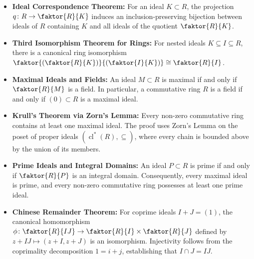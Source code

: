 \begin{overview}
\begin{itemize}
    \item \textbf{Ideal Correspondence Theorem:} For an ideal $K \subset R$, the projection $q \colon R \to \faktor{R}{K}$ induces an inclusion-preserving bijection between ideals of $R$ containing $K$ and all ideals of the quotient $\faktor{R}{K}$.
    \item \textbf{Third Isomorphism Theorem for Rings:} For nested ideals $K \subseteq I \subseteq R$, there is a canonical ring isomorphism $\faktor{\left(\faktor{R}{K}\right)}{\left(\faktor{I}{K}\right)} \cong \faktor{R}{I}$.
    \item \textbf{Maximal Ideals and Fields:} An ideal $M \subset R$ is maximal if and only if $\faktor{R}{M}$ is a field. In particular, a commutative ring $R$ is a field if and only if $(0) \subset R$ is a maximal ideal.
    \item \textbf{Krull's Theorem via Zorn's Lemma:} Every non-zero commutative ring contains at least one maximal ideal. The proof uses Zorn's Lemma on the poset of proper ideals $(\operatorname{cl}^*(R), \subseteq)$, where every chain is bounded above by the union of its members.
    \item \textbf{Prime Ideals and Integral Domains:} An ideal $P \subset R$ is prime if and only if $\faktor{R}{P}$ is an integral domain. Consequently, every maximal ideal is prime, and every non-zero commutative ring possesses at least one prime ideal.
    \item \textbf{Chinese Remainder Theorem:} For coprime ideals $I + J = (1)$, the canonical homomorphism $\phi \colon \faktor{R}{IJ} \to \faktor{R}{I} \times \faktor{R}{J}$ defined by $z + IJ \mapsto (z + I, z + J)$ is an isomorphism. Injectivity follows from the coprimality decomposition $1 = i + j$, establishing that $I \cap J = IJ$.
\end{itemize}
\end{overview}